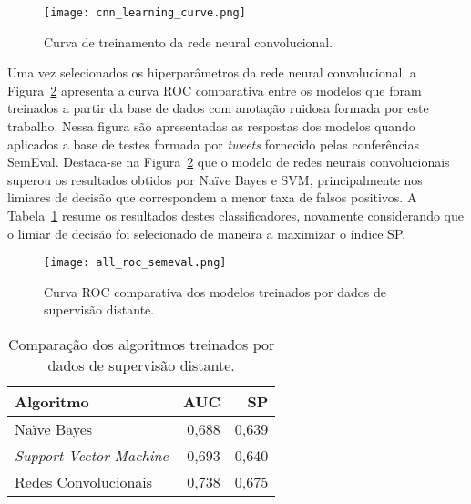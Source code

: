 \begin{figure}
\begin{center} {
    \begin{center}
    \texttt{[image: cnn\_learning\_curve.png]}
    \caption{Curva de treinamento da rede neural convolucional.}
    \label{fig:cnn_learning_curve}
    \end{center}
}
\end{center}
\end{figure}

Uma vez selecionados os hiperparâmetros da rede neural convolucional, a Figura~\ref{fig:all_roc_semeval} apresenta a
curva ROC comparativa entre os modelos que foram treinados a partir da base de dados com anotação ruidosa formada por
este trabalho.
Nessa figura são apresentadas as respostas dos modelos quando aplicados a base de testes formada por \textit{tweets}
fornecido pelas conferências SemEval.
Destaca-se na Figura~\ref{fig:all_roc_semeval} que o modelo de redes neurais convolucionais superou os resultados
obtidos por Naïve Bayes e SVM, principalmente nos limiares de decisão que correspondem a menor taxa de falsos positivos.
A Tabela~\ref{tab:all_compara} resume os resultados destes classificadores, novamente considerando que o limiar de
decisão foi selecionado de maneira a maximizar o índice SP.

\begin{figure}
\begin{center} {
    \begin{center}
    \texttt{[image: all\_roc\_semeval.png]}
    \caption{Curva ROC comparativa dos modelos treinados por dados de supervisão distante.}
    \label{fig:all_roc_semeval}
    \end{center}
}
\end{center}
\end{figure}

\begin{table}[h]
    \begin{center}
        \begin{tabular}{| l | r | r |}
        \hline
        \textbf{Algoritmo} & \textbf{AUC} & \textbf{SP} \\ \hline
        Naïve Bayes & 0,688 & 0,639 \\ \hline
        \textit{Support Vector Machine} & 0,693 & 0,640 \\ \hline
        Redes Convolucionais & 0,738 & 0,675 \\ \hline
        \end{tabular}
        \caption{Comparação dos algoritmos treinados por dados de supervisão distante.}
        \label{tab:all_compara}
    \end{center}
\end{table}

